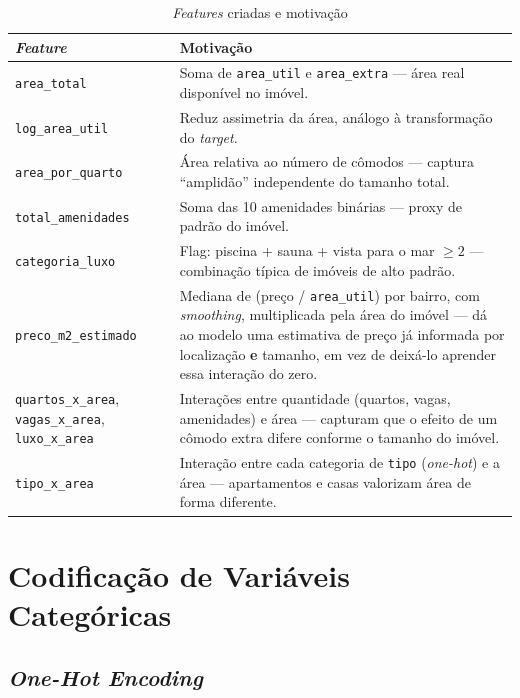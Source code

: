 \documentclass[12pt, a4paper]{article}
\newcommand{\code}[1]{\texttt{#1}}
\begin{document}
\begin{table}[H]
  \centering
  \caption{\textit{Features} criadas e motivação}
  \label{tab:features}
  \small{}
  \begin{tabular}{lp{9cm}}
    \toprule
    \rowcolor{headerblue}
    \color{white}\textbf{\textit{Feature}} & \color{white}\textbf{Motivação} \\
    \midrule
    \code{area\_total}            & Soma de \code{area\_util} e \code{area\_extra} --- área real disponível no imóvel. \\
    \code{log\_area\_util}        & Reduz assimetria da área, análogo à transformação do \textit{target}. \\
    \code{area\_por\_quarto}      & Área relativa ao número de cômodos --- captura ``amplidão'' independente do tamanho total. \\
    \code{total\_amenidades}      & Soma das 10 amenidades binárias --- proxy de padrão do imóvel. \\
    \code{categoria\_luxo}        & Flag: piscina + sauna + vista para o mar $\geq 2$ --- combinação típica de imóveis de alto padrão. \\
    \code{preco\_m2\_estimado}    & Mediana de (preço / \code{area\_util}) por bairro, com \textit{smoothing}, multiplicada pela área do imóvel --- dá ao modelo uma estimativa de preço já informada por localização \textbf{e} tamanho, em vez de deixá-lo aprender essa interação do zero. \\
    \code{quartos\_x\_area}, \code{vagas\_x\_area}, \code{luxo\_x\_area} & Interações entre quantidade (quartos, vagas, amenidades) e área --- capturam que o efeito de um cômodo extra difere conforme o tamanho do imóvel. \\
    \code{tipo\_x\_area}          & Interação entre cada categoria de \code{tipo} (\textit{one-hot}) e a área --- apartamentos e casas valorizam área de forma diferente. \\
    \bottomrule
  \end{tabular}
\end{table}

\section{Codificação de Variáveis Categóricas}
\label{sec:encoding}

\subsection{\textit{One-Hot Encoding}}
\end{document}
